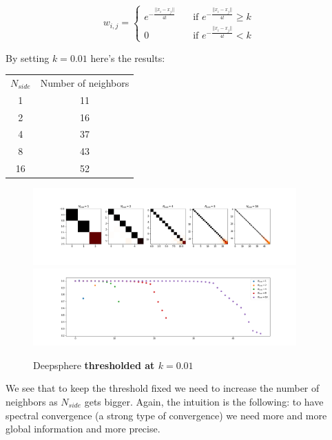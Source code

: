$$w_{i,j} = \begin{cases}
e^{-\frac{||x_i-x_j||}{4t}}\quad& \text{if } e^{-\frac{||x_i-x_j||}{4t}} \geq k\\
0 \quad & \text{if } e^{-\frac{||x_i-x_j||}{4t}} < k
\end{cases}$$

By setting $k = 0.01$ here's the results:

\begin{center}
	\begin{tabular}{ c|c} 

		$N_{side}$ & Number of neighbors \\ 
	
		1 & 11 \\ 
		2 & 16 \\ 
		4 & 37 \\ 
		8 & 43 \\ 
		16 & 52 \\ 

\end{tabular}
\end{center}

\begin{figure}[h]
	\label{fig:DeepSphere_thresholded}
	\caption{Deepsphere \textbf{thresholded at $k=0.01$}}
	\centering
	\includegraphics[width=0.9\textwidth]{../codes/06_figures/deepsphere_thresholded.png}	
	\includegraphics[width=0.9\textwidth]{../codes/06_figures/deepsphere_thresholded_diagonal.png}	
\end{figure}

We see that to keep the threshold fixed we need to increase the number of neighbors as $N_{side}$ gets bigger. Again, the intuition is the following: to have spectral convergence (a strong type of convergence) we need more and more global information and more precise. 

\clearpage


